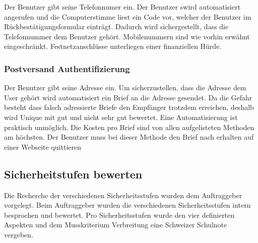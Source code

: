 Der Benutzer gibt seine Telefonnumer ein. Der Benutzer swird
automatisiert angerufen und die Computerstimme liest ein Code vor,
welcher der Benutzer im Rückbestätigungsformular einträgt. Dadurch wird
sichergestellt, dass die Telefonnummer dem Benutzer gehört.
Mobilenummern sind wie vorhin erwähnt eingeschränkt. Festnetzanschlüsse
unterliegen einer finanziellen Hürde.

\subsubsection{Postversand
Authentifizierung}\label{postversand-authentifizierung}

Der Benutzer gibt seine Adresse ein. Um sicherzustellen, dass die
Adresse dem User gehört wird automatisiert ein Brief an die Adresse
gesendet. Da die Gefahr besteht dass falsch adressierte Briefe den
Empfänger trotzdem erreichen, deshalb wird Unique mit gut und nicht sehr
gut bewertet. Eine Automatisierung ist praktisch unmöglich. Die Kosten
pro Brief sind von allen aufgelisteten Methoden am höchsten. Der
Benutzer muss bei dieser Methode den Brief nach erhalten auf einer
Webseite quittieren

\hypertarget{sicherheitstufen-bewerten}{\subsection{Sicherheitstufen
bewerten}\label{sicherheitstufen-bewerten}}

Die Recherche der verschiedenen Sicherheitsstufen wurden dem
Auftraggeber vorgelegt. Beim Auftraggeber wurden die verschiedenen
Sicherheitsstufen intern besprochen und bewertet. Pro Sicherheitsstufen
wurde den vier definierten Aspekten und dem Musskriterium Verbreitung
eine Schweizer Schulnote vergeben.

